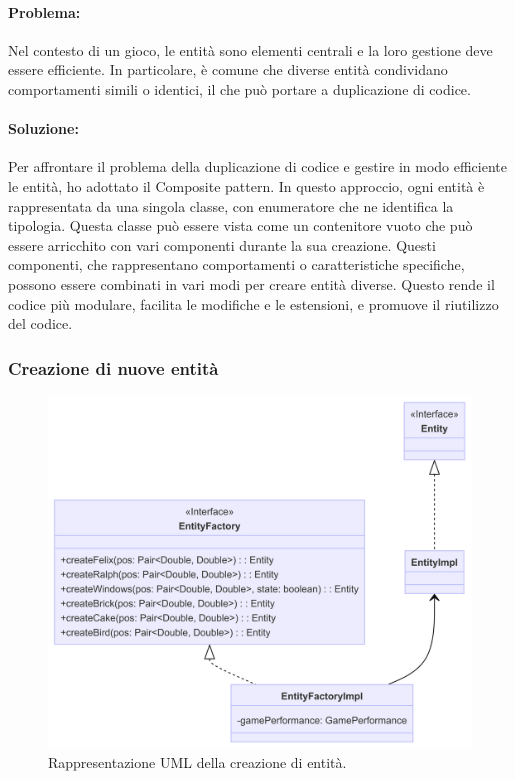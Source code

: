 \documentclass[a4paper,12pt]{report}
\begin{document}
\paragraph{Problema:}
Nel contesto di un gioco, le entità sono elementi centrali e la loro gestione deve essere efficiente. In particolare, è comune che diverse entità condividano comportamenti simili o identici, il che può portare a duplicazione di codice. 

\paragraph{Soluzione:}
Per affrontare il problema della duplicazione di codice e gestire in modo efficiente le entità, ho adottato il Composite pattern. In questo approccio, ogni entità è rappresentata da una singola classe, con enumeratore che ne identifica la tipologia. Questa classe può essere vista come un contenitore vuoto che può essere arricchito con vari componenti durante la sua creazione. Questi componenti, che rappresentano comportamenti o caratteristiche specifiche, possono essere combinati in vari modi per creare entità diverse. Questo rende il codice più modulare, facilita le modifiche e le estensioni, e promuove il riutilizzo del codice. 

\subsubsection{Creazione di nuove entità}

\begin{figure}[H]
\centering{}
\includegraphics[width=\textwidth]{img/entity_factory.png}
\caption{Rappresentazione UML della creazione di entità.}
\end{figure}
\end{document}
